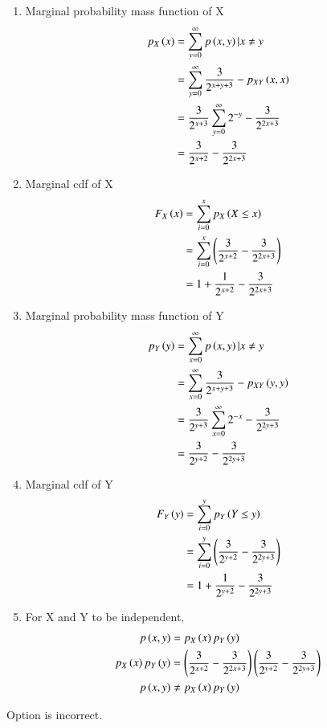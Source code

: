 \documentclass[journal,12pt,twocolumn]{IEEEtran}
\theoremstyle{remark}
\begin{document}
\begin{enumerate}
\item Marginal probability mass function of X
\begin{align}
p_X\left(x\right)&=\sum\limits^{\infty}_{y=0}p\left(x,y\right) \vert x \neq y\\
&=\sum\limits^{\infty}_{y=0}\frac{3}{2^{x+y+3}}- p_{XY}\left(x,x\right)\\
&=\frac{3}{2^{x+3}}\sum\limits^{\infty}_{y=0}2^{-y}-\frac{3}{2^{2x+3}}\\
&=\frac{3}{2^{x+2}}-\frac{3}{2^{2x+3}}
\end{align}
\item Marginal cdf of X
\begin{align}
F_X\left(x\right)&=\sum\limits^{x}_{i=0} p_X\left(X \leq x\right)\\
&=\sum\limits^{x}_{i=0}\left(\frac{3}{2^{x+2}}-\frac{3}{2^{2x+3}}\right)\\
&=1+\frac{1}{2^{x+2}}-\frac{3}{2^{2x+3}}
\end{align}
\item Marginal probability mass function of Y
\begin{align}
p_Y\left(y\right)&=\sum\limits^{\infty}_{x=0}p\left(x,y\right) \vert x \neq y\\
&=\sum\limits^{\infty}_{x=0}\frac{3}{2^{x+y+3}}- p_{XY}\left(y,y\right)\\
&=\frac{3}{2^{y+3}}\sum\limits^{\infty}_{x=0}2^{-x}-\frac{3}{2^{2y+3}}\\
&=\frac{3}{2^{y+2}}-\frac{3}{2^{2y+3}}\\
\end{align}
\item Marginal cdf of Y
\begin{align}
F_Y\left(y\right)&=\sum\limits^{y}_{i=0} p_Y\left(Y \leq y\right)\\
&=\sum\limits^{y}_{i=0}\left(\frac{3}{2^{y+2}}-\frac{3}{2^{2y+3}}\right)\\
&=1+\frac{1}{2^{y+2}}-\frac{3}{2^{2y+3}}
\end{align}
\item For X and Y to be independent,
\begin{align}
p\left(x,y\right)&=p_X\left(x\right) p_Y\left(y\right)\\
p_X\left(x\right) p_Y\left(y\right)&=\left(\frac{3}{2^{x+2}}-\frac{3}{2^{2x+3}}\right)\left(\frac{3}{2^{y+2}}-\frac{3}{2^{2y+3}}\right)\\
p\left(x,y\right) &\neq p_X\left(x\right) p_Y\left(y\right)
\end{align}
\end{enumerate}
Option  is incorrect.\\
\end{document}
